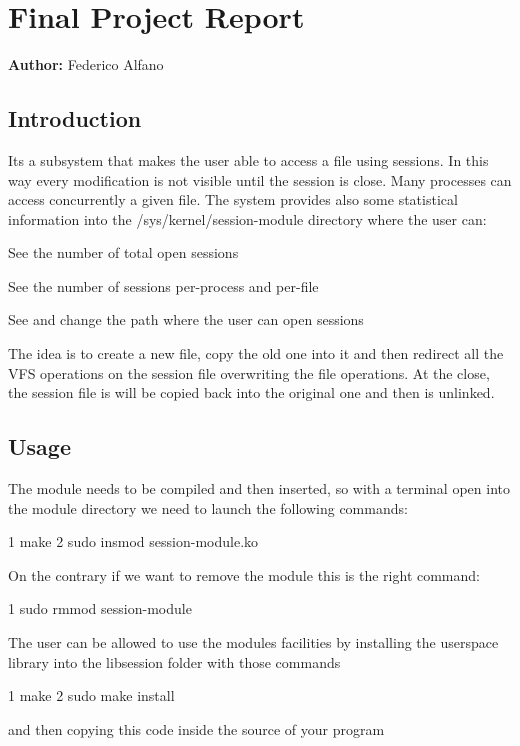 \section*{Final Project Report}

{\bfseries Author\+:} Federico Alfano

\subsection*{Introduction}

It\textquotesingle{}s a subsystem that makes the user able to access a file using sessions. In this way every modification is not visible until the session is close. Many processes can access concurrently a given file. The system provides also some statistical information into the /sys/kernel/session-\/module directory where the user can\+:
\begin{DoxyItemize}
\item See the number of total open sessions
\item See the number of sessions per-\/process and per-\/file
\item See and change the path where the user can open sessions
\end{DoxyItemize}

The idea is to create a new file, copy the old one into it and then redirect all the V\+FS operations on the session file overwriting the file operations. At the close, the session file is will be copied back into the original one and then is unlinked.

\subsection*{Usage}

The module needs to be compiled and then inserted, so with a terminal open into the module directory we need to launch the following commands\+:


\begin{DoxyCode}
1 make
2 sudo insmod session-module.ko
\end{DoxyCode}
 On the contrary if we want to remove the module this is the right command\+: 
\begin{DoxyCode}
1 sudo rmmod session-module
\end{DoxyCode}
 The user can be allowed to use the module\textquotesingle{}s facilities by installing the userspace library into the libsession folder with those commands 
\begin{DoxyCode}
1 make
2 sudo make install
\end{DoxyCode}
 and then copying this code inside the source of your program


